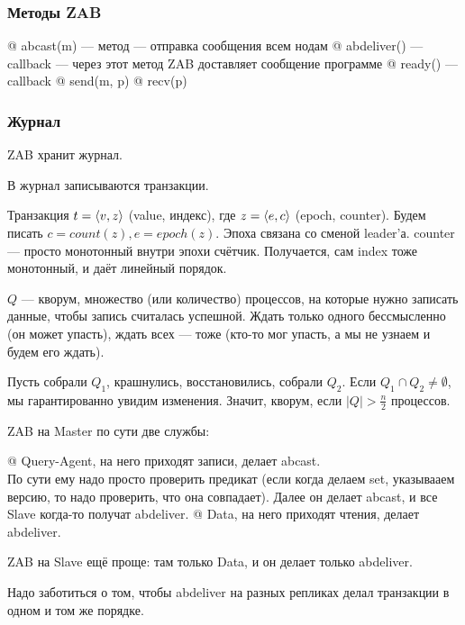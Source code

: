 \subsubsection{Методы ZAB}
\begin{el}[ul]
@ abcast(m) --- метод --- отправка сообщения всем нодам
@ abdeliver() --- callback --- через этот метод ZAB доставляет сообщение программе
@ ready() --- callback
@ send(m, p)
@ recv(p)
\end{el}

\subsubsection{Журнал}
ZAB хранит журнал.

В журнал записываются транзакции.

Транзакция $t = \langle v, z\rangle$ (value, индекс), где $z = \langle e, c\rangle$ (epoch, counter). Будем писать $c = count(z), e = epoch(z)$.
Эпоха связана со сменой leader'а. counter --- просто монотонный внутри эпохи счётчик. Получается, сам index тоже монотонный, и даёт линейный порядок.

$Q$ --- кворум, множество (или количество) процессов, на которые нужно записать данные, чтобы запись считалась успешной.
Ждать только одного бессмысленно (он может упасть), ждать всех --- тоже (кто-то мог упасть, а мы не узнаем и будем его ждать).

Пусть собрали $Q_1$, крашнулись, восстановились, собрали $Q_2$. Если $Q_1 \cap Q_2 \ne \emptyset$, мы гарантированно увидим изменения. Значит, кворум, если $|Q| > \frac{n}{2}$ процессов.


ZAB на Master по сути две службы:
\begin{el}[ol]
@ Query-Agent, на него приходят записи, делает abcast. \\
По сути ему надо просто проверить предикат (если когда делаем set, указывааем версию, то надо проверить, что она совпадает). Далее он делает abcast, и все Slave когда-то получат abdeliver.
@ Data, на него приходят чтения, делает abdeliver.
\end{el}

ZAB на Slave ещё проще: там только Data, и он делает только abdeliver.

Надо заботиться о том, чтобы abdeliver на разных репликах делал транзакции в одном и том же порядке.

